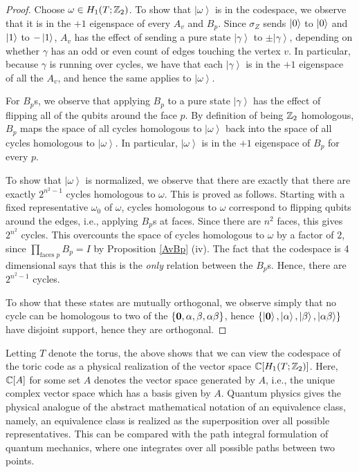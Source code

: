 \documentclass{article}
\theoremstyle{definition}
\numberwithin{figure}{section}
\begin{document}
\begin{proof} Choose $\omega\in H_1(T;\mathbb{Z}_2)$. To show that $\left|\omega\right>$ is in the codespace, we observe that it is in the $+1$ eigenspace of every $A_v$ and $B_p$. Since $\sigma_Z$ sends $\left|0\right>$ to $\left|0\right>$ and $\left|1\right>$ to $-\left|1\right>$, $A_v$ has the effect of sending a pure state $\left|\gamma\right>$ to $\pm\left|\gamma\right>$, depending on whether $\gamma$ has an odd or even count of edges touching the vertex $v$. In particular, because $\gamma$ is running over cycles, we have that each $\left|\gamma\right>$ is in the $+1$ eigenspace of all the $A_v$, and hence the same applies to $\left|\omega\right>$.

For $B_p$s, we observe that applying $B_p$ to a pure state $\left|\gamma\right>$ has the effect of flipping all of the qubits around the face $p$. By definition of being $\mathbb{Z}_2$ homologous, $B_p$ maps the space of all cycles homologous to $\left|\omega\right>$ back into the space of all cycles homologous to $\left|\omega\right>$. In particular, $\left|\omega\right>$ is in the $+1$ eigenspace of $B_p$ for every $p$.

To show that $\left|\omega\right>$ is normalized, we observe that there are exactly that there are exactly $2^{n^2-1}$ cycles homologous to $\omega$. This is proved as follows. Starting with a fixed representative $\omega_0$ of $\omega$, cycles homologous to $\omega$ correspond to flipping qubits around the edges, i.e., applying $B_p$s at faces. Since there are $n^2$ faces, this gives $2^{n^2}$ cycles. This overcounts the space of cycles homologous to $\omega$ by a factor of $2$, since $\prod_{\text{faces }p}B_p=I$ by Proposition \ref{AvBp} (iv). The fact that the codespace is 4 dimensional says that this is the \textit{only} relation between the $B_p$s. Hence, there are $2^{n^2-1}$ cycles.

To show that these states are mutually orthogonal, we observe simply that no cycle can be homologous to two of the $\{\bold{0},\alpha,\beta,\alpha\beta\}$, hence $\left\{\left|\bold{0}\right>,\left|\alpha\right>,\left|\beta\right>,\left|\alpha\beta\right>\right\}$ have disjoint support, hence they are orthogonal.
\end{proof}

Letting $T$ denote the torus, the above shows that we can view the codespace of the toric code as a physical realization of the vector space $\mathbb{C}[H_1(T;\mathbb{Z}_2)]$. Here, $\mathbb{C}[A]$ for some set $A$ denotes the vector space generated by $A$, i.e., the unique complex vector space which has a basis given by $A$. Quantum physics gives the physical analogue of the abstract mathematical notation of an equivalence class, namely, an equivalence class is realized as the superposition over all possible representatives. This can be compared with the path integral formulation of quantum mechanics, where one integrates over all possible paths between two points.
\end{document}
